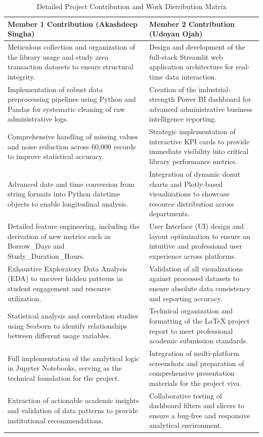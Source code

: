 \documentclass[12pt,a4paper]{report}
\begin{document}
\begin{table}[H]
\centering
\small
\begin{tabularx}{\textwidth}{@{}|X|X|@{}}
\hline
\rowcolor[HTML]{EFEFEF} 
\textbf{Member 1 Contribution (Akashdeep Singha)} & \textbf{Member 2 Contribution (Udoyan Ojah)} \\ \hline
Meticulous collection and organization of the library usage and study area transaction datasets to ensure structural integrity. & Design and development of the full-stack Streamlit web application architecture for real-time data interaction. \\ \hline
Implementation of robust data preprocessing pipelines using Python and Pandas for systematic cleaning of raw administrative logs. & Creation of the industrial-strength Power BI dashboard for advanced administrative business intelligence reporting. \\ \hline
Comprehensive handling of missing values and noise reduction across 60,000 records to improve statistical accuracy. & Strategic implementation of interactive KPI cards to provide immediate visibility into critical library performance metrics. \\ \hline
Advanced date and time conversion from string formats into Python datetime objects to enable longitudinal analysis. & Integration of dynamic donut charts and Plotly-based visualizations to showcase resource distribution across departments. \\ \hline
Detailed feature engineering, including the derivation of new metrics such as Borrow\_Days and Study\_Duration\_Hours. & User Interface (UI) design and layout optimization to ensure an intuitive and professional user experience across platforms. \\ \hline
Exhaustive Exploratory Data Analysis (EDA) to uncover hidden patterns in student engagement and resource utilization. & Validation of all visualizations against processed datasets to ensure absolute data consistency and reporting accuracy. \\ \hline
Statistical analysis and correlation studies using Seaborn to identify relationships between different usage variables. & Technical organization and formatting of the LaTeX project report to meet professional academic submission standards. \\ \hline
Full implementation of the analytical logic in Jupyter Notebooks, serving as the technical foundation for the project. & Integration of multi-platform screenshots and preparation of comprehensive presentation materials for the project viva. \\ \hline
Extraction of actionable academic insights and validation of data patterns to provide institutional recommendations. & Collaborative testing of dashboard filters and slicers to ensure a bug-free and responsive analytical environment. \\ \hline
\end{tabularx}
\caption{Detailed Project Contribution and Work Distribution Matrix}
\label{table:contribution}
\end{table}
\FloatBarrier
\end{document}
